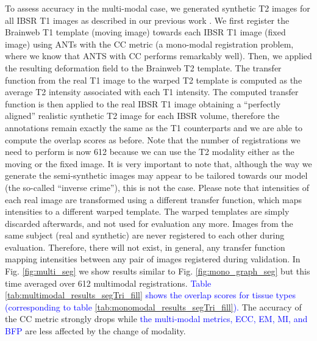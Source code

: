 To assess accuracy in the multi-modal case, we generated synthetic T2 images for all IBSR T1 images as described in our previous work \cite{Ocegueda2015}. We first register the Brainweb T1 template (moving image) towards each IBSR T1 image (fixed image) using ANTs with the CC metric (a mono-modal registration problem, where we know that ANTS with CC performs remarkably well). Then, we applied the resulting deformation field to the Brainweb T2 template. The transfer function from the real T1 image to the warped T2 template is computed as the average T2 intensity associated with each T1 intensity. The computed transfer function is then applied to the real IBSR T1 image obtaining a ``perfectly aligned'' realistic synthetic T2 image for each IBSR volume, therefore the annotations remain exactly the same as the T1 counterparts and we are able to compute the overlap scores as before. Note that the number of registrations we need to perform is now 612 because we can use the T2 modality either as the moving or the fixed image. It is very important to note that, although the way we generate the semi-synthetic images may appear to be tailored towards our model (the so-called ``inverse crime''), this is not the case. Please note that intensities of each real image are transformed using a different transfer function, which maps intensities to a different warped template. The warped templates are simply discarded afterwards, and not used for evaluation any more. Images from the same subject (real and synthetic) are never registered to each other during evaluation. Therefore, there will not exist, in general, any transfer function mapping intensities between any pair of images registered during validation. In Fig. \ref{fig:multi_seg} we show results similar to Fig. \ref{fig:mono_graph_seg} but this time averaged over 612 multimodal registrations. \textcolor{blue}{ Table \ref{tab:multimodal_results_segTri_fill} shows the overlap scores for tissue types (corresponding to table \ref{tab:monomodal_results_segTri_fill}).} The accuracy of the CC metric strongly drops while \textcolor{blue}{ the multi-modal metrics, ECC, EM, MI, and BFP} are less affected by the change of modality.\\




